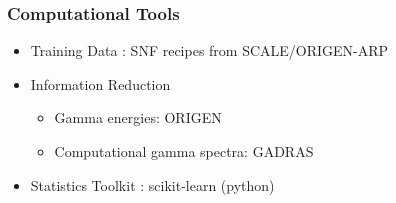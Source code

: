 
\begin{frame}
  \frametitle{Computational Tools}
  \begin{itemize}
    \item Training Data : SNF recipes from SCALE/ORIGEN-ARP \cite{scale, origen}
    \item Information Reduction
    \begin{itemize}
      \item Gamma energies: ORIGEN
      \item Computational gamma spectra: GADRAS \cite{gadras}
    \end{itemize}
    \item Statistics Toolkit : scikit-learn (python) \cite{scikit}
  \end{itemize}
\end{frame}

